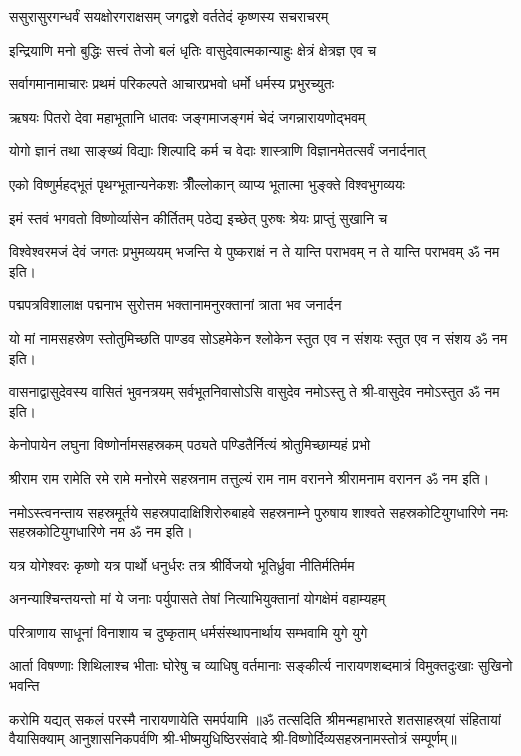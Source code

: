 \twolineshloka
{ससुरासुरगन्धर्वं सयक्षोरगराक्षसम्}
{जगद्वशे वर्ततेदं कृष्णस्य सचराचरम्}

\twolineshloka
{इन्द्रियाणि मनो बुद्धिः सत्त्वं तेजो बलं धृतिः}
{वासुदेवात्मकान्याहुः क्षेत्रं क्षेत्रज्ञ एव च}

\twolineshloka
{सर्वागमानामाचारः प्रथमं परिकल्पते}
{आचारप्रभवो धर्मो धर्मस्य प्रभुरच्युतः}

\twolineshloka
{ऋषयः पितरो देवा महाभूतानि धातवः}
{जङ्गमाजङ्गमं चेदं जगन्नारायणोद्भवम्}

\twolineshloka
{योगो ज्ञानं तथा साङ्ख्यं विद्याः शिल्पादि कर्म च}
{वेदाः शास्त्राणि विज्ञानमेतत्सर्वं जनार्दनात्}

\twolineshloka
{एको विष्णुर्महद्भूतं पृथग्भूतान्यनेकशः}
{त्रीँल्लोकान् व्याप्य भूतात्मा भुङ्क्ते विश्वभुगव्ययः}

\twolineshloka
{इमं स्तवं भगवतो विष्णोर्व्यासेन कीर्तितम्}
{पठेद्य इच्छेत् पुरुषः श्रेयः प्राप्तुं सुखानि च}

\twolineshloka
{विश्वेश्वरमजं देवं जगतः प्रभुमव्ययम्}
{भजन्ति ये पुष्कराक्षं न ते यान्ति पराभवम्}
न ते यान्ति पराभवम् ॐ नम इति।

\twolineshloka
{पद्मपत्रविशालाक्ष पद्मनाभ सुरोत्तम}
{भक्तानामनुरक्तानां त्राता भव जनार्दन}

\twolineshloka
{यो मां नामसहस्रेण स्तोतुमिच्छति पाण्डव}
{सोऽहमेकेन श्लोकेन स्तुत एव न संशयः}
स्तुत एव न संशय ॐ नम इति।

\twolineshloka
{वासनाद्वासुदेवस्य वासितं भुवनत्रयम्}
{सर्वभूतनिवासोऽसि वासुदेव नमोऽस्तु ते}
श्री-वासुदेव नमोऽस्तुत ॐ नम इति।

\twolineshloka
{केनोपायेन लघुना विष्णोर्नामसहस्रकम्}
{पठ्यते पण्डितैर्नित्यं श्रोतुमिच्छाम्यहं प्रभो}

\twolineshloka
{श्रीराम राम रामेति रमे रामे मनोरमे}
{सहस्रनाम तत्तुल्यं राम नाम वरानने}%
श्रीरामनाम वरानन ॐ नम इति।

\twolineshloka
{नमोऽस्त्वनन्ताय सहस्रमूर्तये सहस्रपादाक्षिशिरोरुबाहवे}
{सहस्रनाम्ने पुरुषाय शाश्वते सहस्रकोटियुगधारिणे नमः}
सहस्रकोटियुगधारिणे नम ॐ नम इति।

\twolineshloka
{यत्र योगेश्वरः कृष्णो यत्र पार्थो धनुर्धरः}
{तत्र श्रीर्विजयो भूतिर्ध्रुवा नीतिर्मतिर्मम}

\twolineshloka
{अनन्याश्चिन्तयन्तो मां ये जनाः पर्युपासते}
{तेषां नित्याभियुक्तानां योगक्षेमं वहाम्यहम्}

\twolineshloka
{परित्राणाय साधूनां विनाशाय च दुष्कृताम्}
{धर्मसंस्थापनार्थाय सम्भवामि युगे युगे}

\fourlineindentedshloka
{आर्ता विषण्णाः शिथिलाश्च भीताः}
{घोरेषु च व्याधिषु वर्तमानाः}
{सङ्कीर्त्य नारायणशब्दमात्रं}
{विमुक्तदुःखाः सुखिनो भवन्ति}

{करोमि यद्यत् सकलं परस्मै नारायणायेति समर्पयामि}
॥ॐ तत्सदिति श्रीमन्महाभारते शतसाहस्र्यां संहितायां वैयासिक्याम् आनुशासनिकपर्वणि श्री-भीष्मयुधिष्ठिरसंवादे श्री-विष्णोर्दिव्यसहस्रनामस्तोत्रं सम्पूर्णम्॥
\setlength{\shlokaspaceskip}{24pt}
